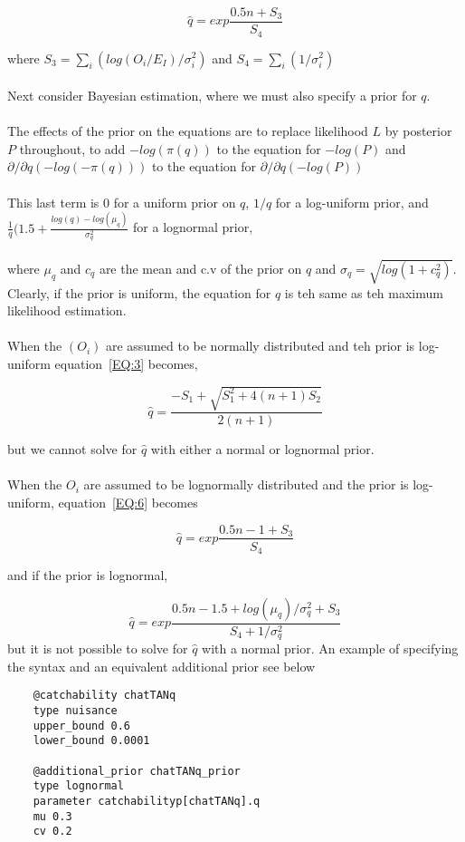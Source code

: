 \begin{equation}\label{EQ:6}
\hat q = exp\frac{0.5n + S_3}{S_4} 
\end{equation}

where $S_3 = \sum_i (log(O_i /E_I)/\sigma_i^2)$ and $S_4 = \sum_i(1/\sigma_i^2)$ 
\\\\
Next consider Bayesian estimation, where we must also specify a prior for $q$.
\\\\
The effects of the prior on the equations are to replace likelihood $L$ by posterior $P$ throughout, to add $-log(\pi(q))$ to the equation for $-log(P)$ and $\partial/\partial q(-log(-\pi(q)))$ to the equation for $\partial/\partial q(-log(P))$
\\\\
This last term is 0 for a uniform prior on $q$, $1/q$ for a log-uniform prior, and $\frac{1}{q}\bigg( 1.5 + \frac{log(q) - log(\mu_q)}{\sigma_q^2}$ for a lognormal prior, 
\\\\
where $\mu_q$ and $c_q$ are the mean and c.v of the prior on $q$ and $\sigma_q = \sqrt{log(1+c_q^2)}$. Clearly, if the prior is uniform, the equation for $\hat q$ is teh same as teh maximum likelihood estimation.
\\\\
When the $(O_i)$ are assumed to be normally distributed and teh prior is log-uniform equation~\eqref{EQ:3} becomes,

\begin{equation}\label{EQ:7}
\hat q = \frac{-S_1 + \sqrt{S_1^2 + 4(n + 1)S_2}}{2(n+1)} 
\end{equation}

but we cannot solve for $\hat q$ with either a normal or lognormal prior.
\\\\
When the $O_i$ are assumed to be lognormally distributed and the prior is log-uniform, equation~\eqref{EQ:6} becomes 


\begin{equation}\label{EQ:8}
\hat q = exp\frac{0.5n -1 + S_3}{S_4} 
\end{equation}

and if the prior is lognormal,

\begin{equation}\label{EQ:9}
\hat q = exp\frac{0.5n -1.5 + log(\mu_q)/\sigma_q^2 + S_3}{S_4 + 1 / \sigma_q^2} 
\end{equation}
but it is not possible to solve for $\hat q$ with a normal prior. An example of specifying the syntax and an equivalent additional prior see below
{\small{\begin{verbatim}
	@catchability chatTANq
	type nuisance
	upper_bound 0.6
	lower_bound 0.0001
	
	@additional_prior chatTANq_prior
	type lognormal
	parameter catchabilityp[chatTANq].q
	mu 0.3
	cv 0.2	
	\end{verbatim}}}


